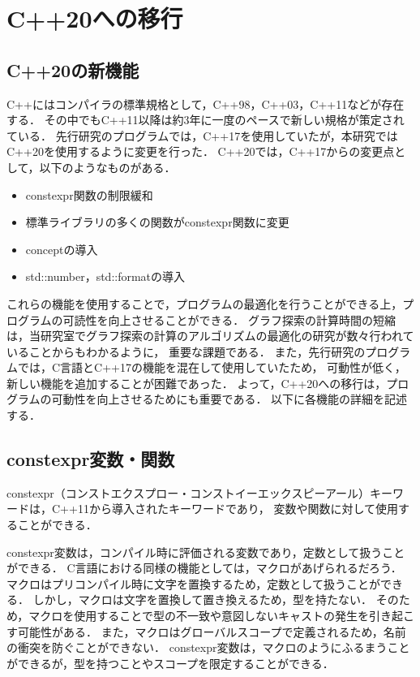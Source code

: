 ﻿%

\chapter{C++20への移行}\label{chapter:appendix_cpp20}
\section{C++20の新機能}
C++にはコンパイラの標準規格として，C++98，C++03，C++11などが存在する．
その中でもC++11以降は約3年に一度のペースで新しい規格が策定されている．
先行研究のプログラムでは，C++17を使用していたが，本研究ではC++20\cite{Thomas_C++20}を使用するように変更を行った．
C++20では，C++17からの変更点として，以下のようなものがある．
\begin{itemize}
  \item constexpr関数の制限緩和
  \item 標準ライブラリの多くの関数がconstexpr関数に変更
  \item conceptの導入
  \item std::number，std::formatの導入
\end{itemize}
これらの機能を使用することで，プログラムの最適化を行うことができる上，プログラムの可読性を向上させることができる．
グラフ探索の計算時間の短縮は，当研究室でグラフ探索の計算のアルゴリズムの最適化の研究が数々行われていることからもわかるように，
重要な課題である．
また，先行研究のプログラムでは，C言語とC++17の機能を混在して使用していたため，
可動性が低く，新しい機能を追加することが困難であった．
よって，C++20への移行は，プログラムの可動性を向上させるためにも重要である．
以下に各機能の詳細を記述する．

\section{constexpr変数・関数}
constexpr（コンストエクスプロー・コンストイーエックスピーアール）キーワードは，C++11から導入されたキーワードであり，
変数や関数に対して使用することができる．

constexpr変数は，コンパイル時に評価される変数であり，定数として扱うことができる．
C言語における同様の機能としては，マクロがあげられるだろう．
マクロはプリコンパイル時に文字を置換するため，定数として扱うことができる．
しかし，マクロは文字を置換して置き換えるため，型を持たない．
そのため，マクロを使用することで型の不一致や意図しないキャストの発生を引き起こす可能性がある．
また，マクロはグローバルスコープで定義されるため，名前の衝突を防ぐことができない．
constexpr変数は，マクロのようにふるまうことができるが，型を持つことやスコープを限定することができる．

